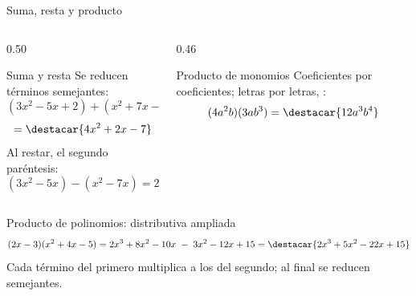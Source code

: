 \documentclass[aspectratio=169,10pt]{beamer}
\begin{document}
\begin{frame}{Suma, resta y producto}
  \scriptsize
  \begin{columns}[T,onlytextwidth]
    \begin{column}{0.50\textwidth}
      \begin{block}{Suma y resta}
        \tiny
        Se reducen términos semejantes:
        \[ (3x^{2}-5x+2) + (x^{2}+7x-9) \]
        \[ = \destacar{4x^{2}+2x-7} \]
        Al restar,  el segundo paréntesis:
        \[ (3x^{2}-5x) - (x^{2}-7x) = 2x^{2}+2x \]
      \end{block}
    \end{column}
    \begin{column}{0.46\textwidth}
      \begin{block}{Producto de monomios}
        \tiny
        Coeficientes por coeficientes; letras por letras, :
        \[ (4a^{2}b)(3ab^{3}) = \destacar{12a^{3}b^{4}} \]
      \end{block}
    \end{column}
  \end{columns}

  \vspace{0.05cm}
  \begin{exampleblock}{Producto de polinomios: distributiva ampliada}
    \tiny
    \[ (2x-3)(x^{2}+4x-5) = 2x^{3}+8x^{2}-10x \;-\; 3x^{2}-12x+15
       = \destacar{2x^{3}+5x^{2}-22x+15} \]
    Cada término del primero multiplica a  los del segundo; al
    final se reducen semejantes.
  \end{exampleblock}
\end{frame}
\end{document}
